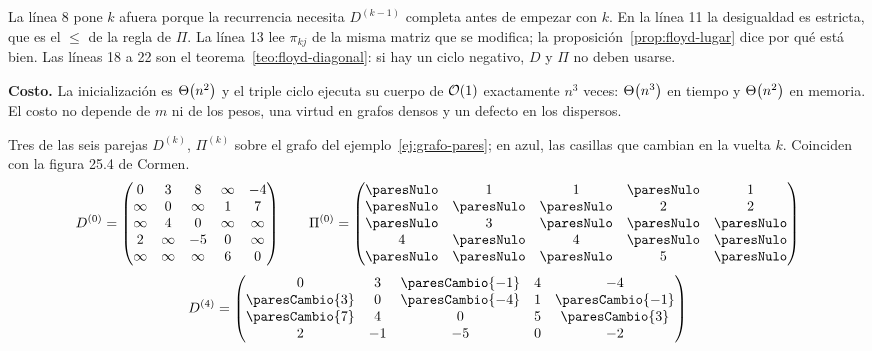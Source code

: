 \documentclass[11pt,letterpaper]{article}
\begin{document}
La línea 8 pone $k$ afuera porque la recurrencia necesita $D^{(k-1)}$
completa antes de empezar con $k$. En la línea 11 la desigualdad es
estricta, que es el $\le$ de la regla de $\Pi$. La línea 13 lee
$\pi_{kj}$ de la misma matriz que se modifica; la
proposición~\ref{prop:floyd-lugar} dice por qué está bien. Las líneas
18 a 22 son el teorema~\ref{teo:floyd-diagonal}: si hay un ciclo
negativo, $D$ y $\Pi$ no deben usarse.

\textbf{Costo.} La inicialización es $\Theta\!\left(n^2\right)$ y el triple ciclo
ejecuta su cuerpo de $\mathcal{O}\!\left(1\right)$ exactamente $n^3$ veces: $\Theta\!\left(n^3\right)$
en tiempo y $\Theta\!\left(n^2\right)$ en memoria. El costo no depende de $m$ ni de
los pesos, una virtud en grafos densos y un defecto en los dispersos.

\begin{ejemplo}
  \label{ej:floyd-pares}
  Tres de las seis parejas $D^{(k)}$, $\Pi^{(k)}$ sobre el grafo del
  ejemplo~\ref{ej:grafo-pares}; en azul, las casillas que cambian en
  la vuelta $k$. Coinciden con la figura 25.4 de Cormen.
  {\small
  \setlength{\arraycolsep}{3.5pt}
  \[
  D^{(0)} = \begin{pmatrix}
    0 & 3 & 8 & \infty & -4 \\
    \infty & 0 & \infty & 1 & 7 \\
    \infty & 4 & 0 & \infty & \infty \\
    2 & \infty & -5 & 0 & \infty \\
    \infty & \infty & \infty & 6 & 0
  \end{pmatrix}
  \qquad
  \Pi^{(0)} = \begin{pmatrix}
    \paresNulo & 1 & 1 & \paresNulo & 1 \\
    \paresNulo & \paresNulo & \paresNulo & 2 & 2 \\
    \paresNulo & 3 & \paresNulo & \paresNulo & \paresNulo \\
    4 & \paresNulo & 4 & \paresNulo & \paresNulo \\
    \paresNulo & \paresNulo & \paresNulo & 5 & \paresNulo
  \end{pmatrix}
  \]
  \[
  D^{(4)} = \begin{pmatrix}
    0 & 3 & \paresCambio{-1} & 4 & -4 \\
    \paresCambio{3} & 0 & \paresCambio{-4} & 1 & \paresCambio{-1} \\
    \paresCambio{7} & 4 & 0 & 5 & \paresCambio{3} \\
    2 & -1 & -5 & 0 & -2 \\

\end{pmatrix}\]}
\end{ejemplo}
\end{document}
